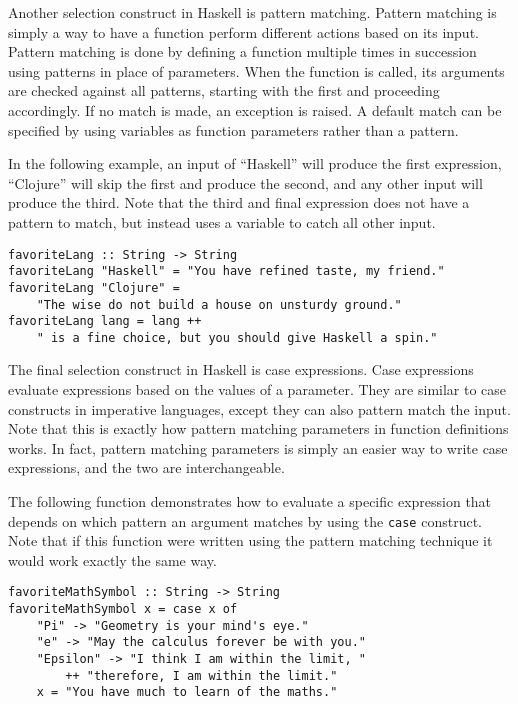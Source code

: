 \documentclass[titlepage,12pt]{article}
\begin{document}
Another selection construct in Haskell is pattern matching. Pattern matching is simply a way to have a 
function perform different actions based on its input. Pattern matching is done by defining a function multiple times in 
succession using patterns in place of parameters.  When the function is called, its arguments are checked against all patterns,
starting with the first and proceeding accordingly.  If no match is made, an exception is raised.
A default match can be specified by using variables as function parameters rather than a pattern.

In the following example, an input of ``Haskell'' will produce the first expression, ``Clojure'' will skip the first 
and produce the second, and any other input will produce the third. Note that the third and final expression does 
not have a pattern to match, but instead uses a variable to catch all other input. 

\begin{verbatim}
favoriteLang :: String -> String
favoriteLang "Haskell" = "You have refined taste, my friend."
favoriteLang "Clojure" = 
    "The wise do not build a house on unsturdy ground."
favoriteLang lang = lang ++ 
    " is a fine choice, but you should give Haskell a spin."
\end{verbatim}

The final selection construct in Haskell is case expressions. Case expressions evaluate expressions based on 
the values of a parameter. They are similar to case constructs in imperative languages, except they can also pattern 
match the input. Note that this is exactly how pattern matching parameters in function definitions works. In 
fact, pattern matching parameters is simply an easier way to write case expressions, and the two are interchangeable. 

The following function demonstrates how to evaluate a specific expression that depends on which pattern 
an argument matches by using the \texttt{case} construct. Note that if this function were written using the 
pattern matching technique it would work exactly the same way. 

\begin{verbatim}
favoriteMathSymbol :: String -> String
favoriteMathSymbol x = case x of
    "Pi" -> "Geometry is your mind's eye."
    "e" -> "May the calculus forever be with you."
    "Epsilon" -> "I think I am within the limit, "
        ++ "therefore, I am within the limit."
    x = "You have much to learn of the maths."
\end{verbatim}
\end{document}

